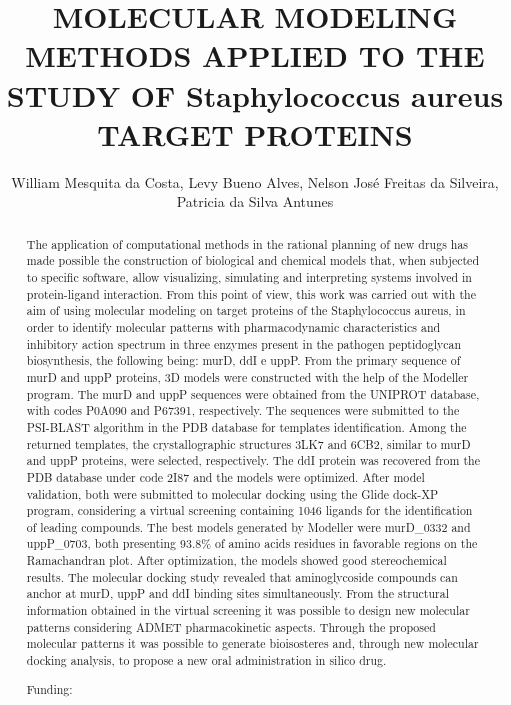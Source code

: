 \documentclass[twoside]{article}
\title{\vspace{-15mm}\fontsize{24pt}{10pt}\selectfont\textbf{ MOLECULAR MODELING METHODS APPLIED TO THE STUDY OF Staphylococcus aureus TARGET PROTEINS }} %
\author{ William Mesquita da Costa, Levy Bueno Alves, Nelson Jos\'e Freitas da Silveira, Patricia da Silva Antunes }
\affil{ Universidade Federal de Alfenas }
\date{}
\begin{document}
  
  
  \maketitle %
  
  
  \thispagestyle{fancy} %
  
  
  \begin{abstract}
  The application of computational methods in the rational planning of new drugs has made possible the construction of biological and chemical models that,  when subjected to specific software,  allow visualizing,  simulating and interpreting systems involved in protein-ligand interaction. From this point of view,  this work was carried out with the aim of using molecular modeling on target proteins of the Staphylococcus aureus,  in order to identify molecular patterns with pharmacodynamic characteristics and inhibitory action spectrum in three enzymes present in the pathogen peptidoglycan biosynthesis,  the following being: murD,  ddI  e uppP. From the primary sequence of murD and uppP proteins,  3D models were constructed with the help of the Modeller program. The murD and uppP sequences were obtained from the UNIPROT database,  with codes P0A090 and P67391,  respectively. The sequences were submitted to the PSI-BLAST algorithm in the PDB database for templates identification. Among the returned templates,  the crystallographic structures 3LK7 and 6CB2,  similar to murD and uppP proteins,  were selected,  respectively. The ddI protein was recovered from the PDB database under code 2I87 and the models were optimized. After model validation,  both were submitted to molecular docking using the Glide dock-XP program,  considering a virtual screening containing 1046 ligands for the identification of leading compounds. The best models generated by Modeller were murD\_0332 and uppP\_0703,  both presenting 93.8\% of amino acids residues in favorable regions on the Ramachandran plot. After optimization,  the models showed good stereochemical results. The molecular docking study revealed that aminoglycoside compounds can anchor at murD,  uppP and ddI binding sites simultaneously. From the structural information obtained in the virtual screening it was possible to design new molecular patterns considering ADMET pharmacokinetic aspects. Through the proposed molecular patterns it was possible to generate bioisosteres and,  through new molecular docking analysis,  to propose a new oral administration in silico drug.
  
  Funding:  \\ 
  \end{abstract}
  
\end{document}

